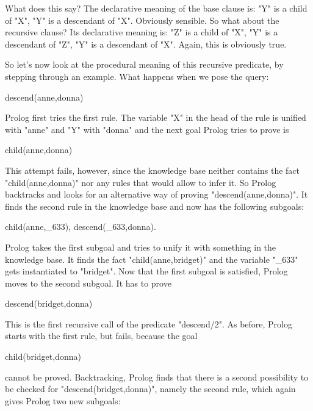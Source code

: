 What does this say?  The declarative meaning of the base clause
is:  "Y" is a child of "X",  "Y" is a
descendant of "X". Obviously sensible.
So what about the recursive clause?  Its declarative meaning is:
 "Z" is a child of "X",  "Y" is a
descendant of "Z",  "Y" is a descendant of
"X". Again, this is obviously true.

So let's now look at the procedural meaning of this recursive
predicate, by stepping through an example. What happens when we pose
the query:
\begin{LPNcodedisplay}
descend(anne,donna)
\end{LPNcodedisplay}
Prolog first tries the first rule. The variable "X" in the head
of the rule is unified with "anne" and "Y" with "donna"  and
the next goal Prolog tries to prove is

\begin{LPNcodedisplay}
child(anne,donna)
\end{LPNcodedisplay}


This attempt fails, however, since the knowledge base
neither contains the fact "child(anne,donna)" nor any rules
that would allow to infer it.
So Prolog backtracks and looks for an alternative way of proving
"descend(anne,donna)". It finds the second rule in the
knowledge base and now has the following subgoals:

\begin{LPNcodedisplay}
child(anne,_633),
descend(_633,donna).
\end{LPNcodedisplay}


Prolog takes the first subgoal and tries to unify  it with something in
the knowledge base. It finds the fact "child(anne,bridget)"
and the variable "_633" gets instantiated to "bridget".
Now that the first subgoal is satisfied, Prolog moves to the
second subgoal. It has to prove

\begin{LPNcodedisplay}
descend(bridget,donna)
\end{LPNcodedisplay}


This is the first recursive call of the predicate "descend/2". As
before, Prolog starts with the first rule, but fails, because the goal

\begin{LPNcodedisplay}
child(bridget,donna)
\end{LPNcodedisplay}
cannot be proved. Backtracking, Prolog finds that there is a second
possibility to be checked for "descend(bridget,donna)", namely the
second rule, which again gives Prolog two new subgoals:

